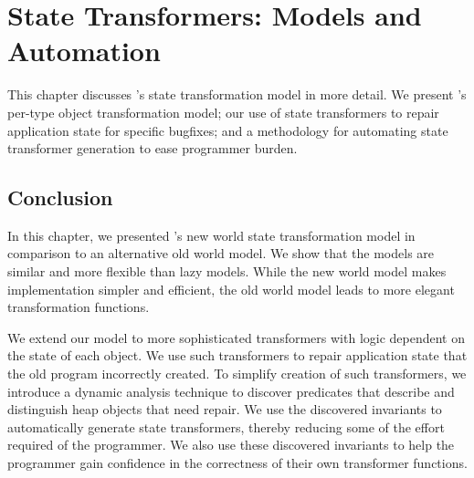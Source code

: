 \chapter{State Transformers: Models and Automation}
\label{chap:transformers}

This chapter discusses \JV's state transformation model in more detail. We
present \JV's per-type object transformation model; our use of state
transformers to repair application state for specific bugfixes; and a
methodology
for automating state transformer generation to ease programmer burden.





\section{Conclusion}
In this chapter, we presented \JV's new world state transformation model
in comparison to an alternative old world model. We show that the models
are similar and more flexible than lazy models. While the new world model
makes implementation simpler and efficient, the old world model leads to
more elegant transformation functions.

We extend our model
to more sophisticated transformers with logic dependent on the state of
each object. We use such transformers to repair application state that the
old program incorrectly created. To simplify creation of such transformers,
we introduce a dynamic analysis technique to discover predicates that
describe and distinguish heap objects that need repair. We use the
discovered invariants to automatically generate state transformers, thereby
reducing some of the effort required of the programmer. We also use these
discovered invariants to help the programmer gain confidence in the
correctness of their own transformer functions.

